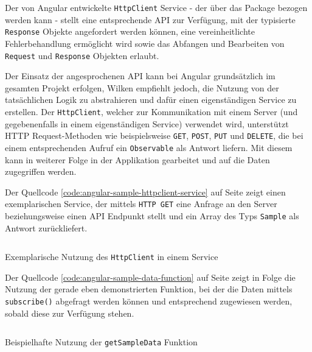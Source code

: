 \documentclass[a4paper,12pt,twoside]{scrreprt}
\begin{document}
\medskip

Der von Angular entwickelte \texttt{HttpClient} Service - der über das  Package bezogen werden kann - stellt eine entsprechende API zur Verfügung, mit der typisierte \texttt{Response} Objekte angefordert werden können, eine vereinheitlichte Fehlerbehandlung ermöglicht wird sowie das Abfangen und Bearbeiten von \texttt{Request} und \texttt{Response} Objekten erlaubt. \parencite[][]{google_llc_communicating_nodate}

\medskip

Der Einsatz der angesprochenen API kann bei Angular grundsätzlich im gesamten Projekt erfolgen, Wilken empfiehlt jedoch, die Nutzung von der tatsächlichen Logik zu abstrahieren und dafür einen eigenständigen Service zu erstellen. Der \texttt{HttpClient}, welcher zur Kommunikation mit einem Server (und gegebenenfalls in einem eigenständigen Service) verwendet wird, unterstützt HTTP Request-Methoden wie beispielsweise \texttt{GET}, \texttt{POST}, \texttt{PUT} und \texttt{DELETE}, die bei einem entsprechenden Aufruf ein \texttt{Observable} als Antwort liefern. Mit diesem kann in weiterer Folge in der Applikation gearbeitet und auf die Daten zugegriffen werden. \parencite[][Seite 142-144.]{wilken_angular_2018}

\medskip

Der Quellcode \ref{code:angular-sample-httpclient-service} auf Seite \pageref{code:angular-sample-httpclient-service} zeigt einen exemplarischen Service, der mittels \texttt{HTTP GET} eine Anfrage an den Server beziehungsweise einen API Endpunkt stellt und ein Array des Typs \texttt{Sample} als Antwort zurückliefert.

\begin{listing}[ht]
    \renewcommand{\fcolorbox}[4][]{#4}
    \inputminted[fontsize=\footnotesize,linenos]{js}{code/sample.service.ts}
    \caption[Exemplarische Nutzung des \texttt{HttpClient} in einem Service]{Exemplarische Nutzung des \texttt{HttpClient} in einem Service}
    \label{code:angular-sample-httpclient-service}
\end{listing}

Der Quellcode \ref{code:angular-sample-data-function} auf Seite \pageref{code:angular-sample-data-function} zeigt in Folge die Nutzung der gerade eben demonstrierten Funktion, bei der die Daten mittels \texttt{subscribe()} abgefragt werden können und entsprechend zugewiesen werden, sobald diese zur Verfügung stehen.

\begin{listing}[ht]
    \renewcommand{\fcolorbox}[4][]{#4}
    \inputminted[fontsize=\footnotesize,linenos]{js}{code/loadSampleData.ts}
    \caption[Beispielhafte Nutzung der \texttt{getSampleData} Funktion]{Beispielhafte Nutzung der \texttt{getSampleData} Funktion}
    \label{code:angular-sample-data-function}
\end{listing}
\end{document}

